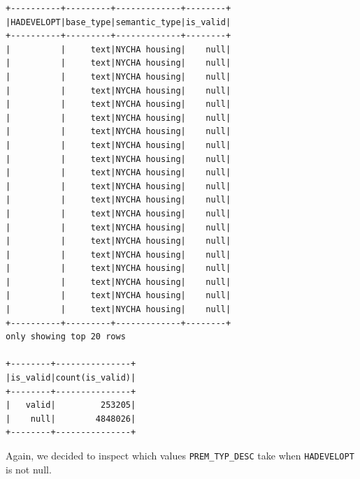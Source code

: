 \documentclass{article}
\begin{document}
\begin{itemize}
\begin{verbatim}
+----------+---------+-------------+--------+
|HADEVELOPT|base_type|semantic_type|is_valid|
+----------+---------+-------------+--------+
|          |     text|NYCHA housing|    null|
|          |     text|NYCHA housing|    null|
|          |     text|NYCHA housing|    null|
|          |     text|NYCHA housing|    null|
|          |     text|NYCHA housing|    null|
|          |     text|NYCHA housing|    null|
|          |     text|NYCHA housing|    null|
|          |     text|NYCHA housing|    null|
|          |     text|NYCHA housing|    null|
|          |     text|NYCHA housing|    null|
|          |     text|NYCHA housing|    null|
|          |     text|NYCHA housing|    null|
|          |     text|NYCHA housing|    null|
|          |     text|NYCHA housing|    null|
|          |     text|NYCHA housing|    null|
|          |     text|NYCHA housing|    null|
|          |     text|NYCHA housing|    null|
|          |     text|NYCHA housing|    null|
|          |     text|NYCHA housing|    null|
|          |     text|NYCHA housing|    null|
+----------+---------+-------------+--------+
only showing top 20 rows

+--------+---------------+
|is_valid|count(is_valid)|
+--------+---------------+
|   valid|         253205|
|    null|        4848026|
+--------+---------------+
\end{verbatim}

Again, we decided to inspect which values \texttt{PREM\_TYP\_DESC} take when \texttt{HADEVELOPT} is not null. 


\end{itemize}
\end{document}
